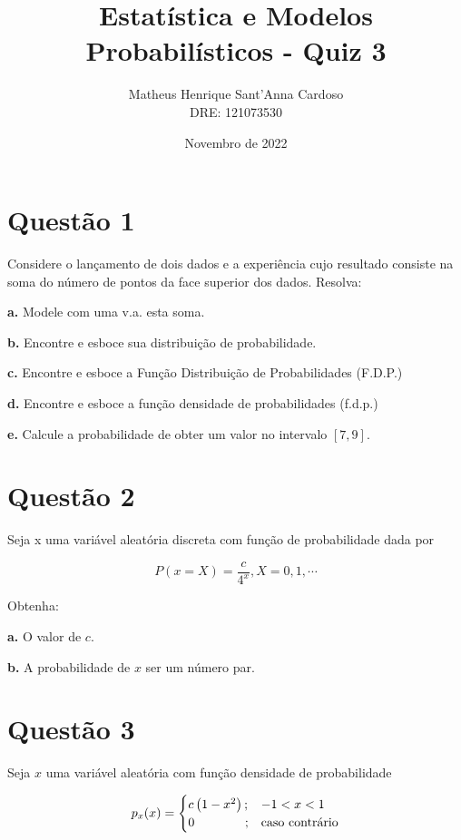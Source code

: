 \documentclass[a5paper]{report}
\title{Estatística e Modelos Probabilísticos - Quiz 3}
\author{
	Matheus Henrique Sant'Anna Cardoso\\
	DRE: 121073530
}
\date{Novembro de 2022}
\begin{document}
	
\maketitle \newpage

\section*{Questão 1}
Considere o lançamento de dois dados e a experiência cujo resultado consiste na soma do número de pontos da face superior dos dados. Resolva:

\textbf{a.}
Modele com uma v.a. esta soma.


\textbf{b.}
Encontre e esboce sua distribuição de probabilidade.


\textbf{c.}
Encontre e esboce a Função Distribuição de Probabilidades (F.D.P.)


\textbf{d.}
Encontre e esboce a função densidade de probabilidades (f.d.p.)


\textbf{e.}
Calcule a probabilidade de obter um valor no intervalo $[7, 9]$.


\section*{Questão 2}
Seja x uma variável aleatória discreta com função de probabilidade dada por

\[P(x=X) = \frac{c}{4^x}, X = 0, 1, \cdots\]

Obtenha:

\textbf{a.} O valor de $c$.

\textbf{b.} A probabilidade de $x$ ser um número par.


\section*{Questão 3}
Seja $x$ uma variável aleatória com função densidade de probabilidade

\begin{equation*}
	p_x(x) =
	\begin{cases}
		c\left(1 - x^2 \right) ; & -1 < x < 1 \\
		0 \hspace{1.4cm}; & \text{caso contrário}
	\end{cases}       
\end{equation*}
\end{document}
